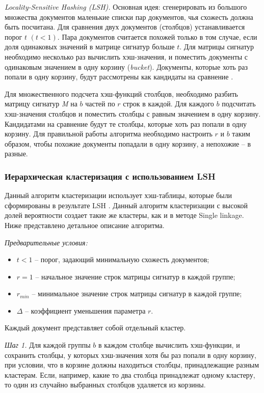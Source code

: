 \textit{Locality-Sensitive Hashing (LSH).} Основная идея: сгенерировать из большого множества документов маленькие списки пар документов, чья схожесть должна быть посчитана. Для сравнения двух документов (столбцов) устанавливается порог \(t\) \((t < 1)\). Пара документов считается похожей только в том случае, если доля одинаковых значений в матрице сигнатур больше \(t\). Для матрицы сигнатур необходимо несколько раз вычислить хэш-значения, и поместить документы с одинаковым значением в одну корзину (\textit{bucket}). Документы, которые хоть раз попали в одну корзину, будут рассмотрены как кандидаты на сравнение \cite{GionisIndykMotwani}.

Для множественного подсчета хэш-функций столбцов, необходимо разбить матрицу сигнатур \textit{M} на \(b\) частей по \(r\) строк в каждой. Для каждого \(b\) подсчитать хэш-значения столбцов и поместить столбцы с равным значением в одну корзину. Кандидатами на сравнение будут те столбцы, которые хоть раз попали в одну корзину. Для правильной работы алгоритма необходимо настроить \(r\) и \(b\) таким образом, чтобы похожие документы попадали в одну корзину, а непохожие -- в разные.

\subsubsection{Иерархическая кластеризация с использованием LSH}

Данный алгоритм кластеризации использует хэш-таблицы, которые были сформированы в результате LSH \cite{KogaIshibashiWatanabe}. Данный алгоритм кластеризации с высокой долей вероятности создает такие же кластеры, как и в методе Single linkage. Ниже представлено детальное описание алгоритма.

\textit{Предварительные условия:}
\begin{itemize}
	\item \(t < 1\) -- порог, задающий минимальную схожесть документов;
	\item \(r = 1\) -- начальное значение строк матрицы сигнатур в каждой группе;
	\item \(r_\textit{min}\) -- минимальное значение строк матрицы сигнатур в каждой группе;
	\item \(\Delta\) -- коэффициент уменьшения параметра \(r\).
\end{itemize}

Каждый документ представляет собой отдельный кластер.

\textit{Шаг 1.} Для каждой группы \(b\) в каждом столбце вычислить хэш-функции, и сохранить столбцы, у которых хэш-значения хотя бы раз попали в одну корзину, при условии, что в корзине должны находиться столбцы, принадлежащие разным кластерам. Если, например, какие то два столбца принадлежат одному кластеру, то один из случайно выбранных столбцов удаляется из корзины.


